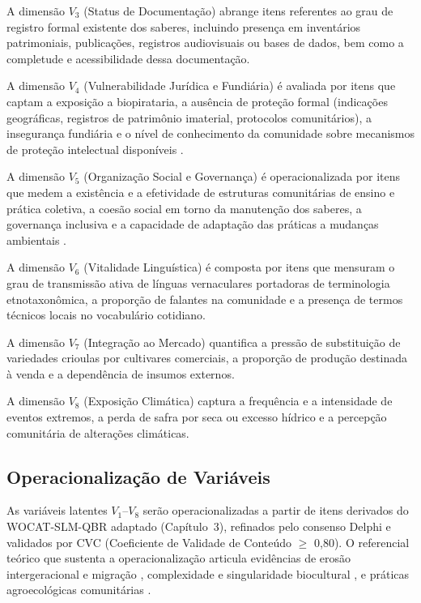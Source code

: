 A dimensão $V_3$ (Status de Documentação) abrange itens referentes ao grau de registro formal existente dos saberes, incluindo presença em inventários patrimoniais, publicações, registros audiovisuais ou bases de dados, bem como a completude e acessibilidade dessa documentação.

A dimensão $V_4$ (Vulnerabilidade Jurídica e Fundiária) é avaliada por itens que captam a exposição a biopirataria, a ausência de proteção formal (indicações geográficas, registros de patrimônio imaterial, protocolos comunitários), a insegurança fundiária e o nível de conhecimento da comunidade sobre mecanismos de proteção intelectual disponíveis \cite{Cordero2018}.

A dimensão $V_5$ (Organização Social e Governança) é operacionalizada por itens que medem a existência e a efetividade de estruturas comunitárias de ensino e prática coletiva, a coesão social em torno da manutenção dos saberes, a governança inclusiva e a capacidade de adaptação das práticas a mudanças ambientais \cite{McGreevy2021,Zhong2025,Akanmu2023}.

A dimensão $V_6$ (Vitalidade Linguística) é composta por itens que mensuram o grau de transmissão ativa de línguas vernaculares portadoras de terminologia etnotaxonômica, a proporção de falantes na comunidade e a presença de termos técnicos locais no vocabulário cotidiano.

A dimensão $V_7$ (Integração ao Mercado) quantifica a pressão de substituição de variedades crioulas por cultivares comerciais, a proporção de produção destinada à venda e a dependência de insumos externos.

A dimensão $V_8$ (Exposição Climática) captura a frequência e a intensidade de eventos extremos, a perda de safra por seca ou excesso hídrico e a percepção comunitária de alterações climáticas.


\subsection{Operacionalização de Variáveis}

As variáveis latentes $V_1$--$V_8$ serão operacionalizadas a partir de itens derivados do WOCAT-SLM-QBR adaptado (Capítulo~3), refinados pelo consenso Delphi e validados por CVC (Coeficiente de Validade de Conteúdo $\geq$ 0,80). O referencial teórico que sustenta a operacionalização articula evidências de erosão intergeracional e migração \cite{Fernndez-Llamazares2020}, complexidade e singularidade biocultural \cite{Aloush2021,Rist2006,Reyes-Garca2020}, e práticas agroecológicas comunitárias \cite{Altieri2012}.


